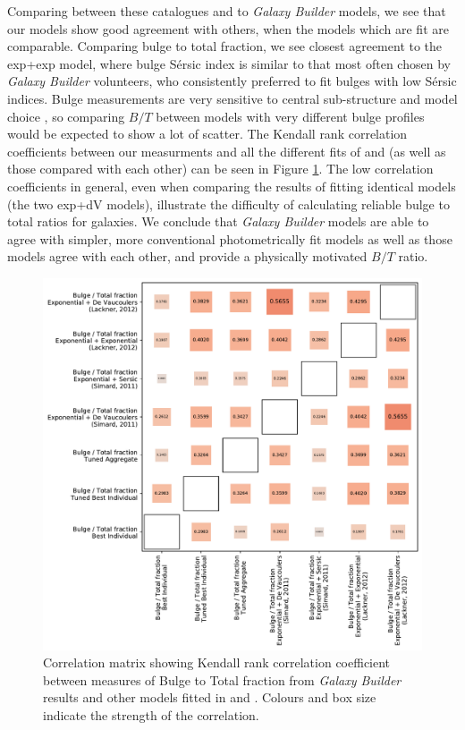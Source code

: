 \documentclass[../main.tex]{subfiles}
\begin{document}
Comparing between these catalogues and to \textit{Galaxy Builder} models, we see that our models show good agreement with others, when the models which are fit are comparable. Comparing bulge to total fraction, we see closest agreement to the exp+exp model, where bulge S\'ersic index is similar to that most often chosen by \textit{Galaxy Builder} volunteers, who consistently preferred to fit bulges with low S\'ersic indices. Bulge measurements are very sensitive to central sub-structure and model choice \citep{Gao2017:1709.00746v1}, so comparing $B/T$ between models with very different bulge profiles would be expected to show a lot of scatter. The Kendall rank correlation coefficients between our measurments and all the different fits of \citet{2011ApJS..196...11S} and \citet{2012MNRAS.421.2277L} (as well as those compared with each other) can be seen in Figure \ref{fig:bt_correlation}. The low correlation coefficients in general, even when comparing the results of fitting identical models (the two exp+dV models), illustrate the difficulty of calculating reliable bulge to total ratios for galaxies. We conclude that \textit{Galaxy Builder} models are able to agree with simpler, more conventional photometrically fit models as well as those models agree with each other, and provide a physically motivated $B/T$ ratio.

\begin{figure}
  \includegraphics[width=17cm]{images__results/b-t_comparison_correlation.pdf}
  \caption{Correlation matrix showing Kendall rank correlation coefficient between measures of Bulge to Total fraction from \textit{Galaxy Builder} results and other models fitted in \citet{2011ApJS..196...11S} and \citet{2012MNRAS.421.2277L}. Colours and box size indicate the strength of the correlation.}
  \label{fig:bt_correlation}
\end{figure}
\end{document}
